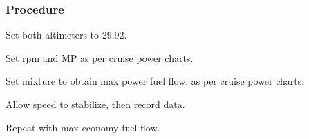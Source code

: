 % 
% 
%
 \subsubsection*{Procedure}
 \begin{compactenum}
   \item Set both altimeters to 29.92.
   \item Set rpm and MP as per cruise power charts.
   \item Set mixture to obtain max power fuel flow, as per cruise power charts.
   \item Allow speed to stabilize, then record data.
   \item Repeat with max economy fuel flow.
   \end{compactenum}
